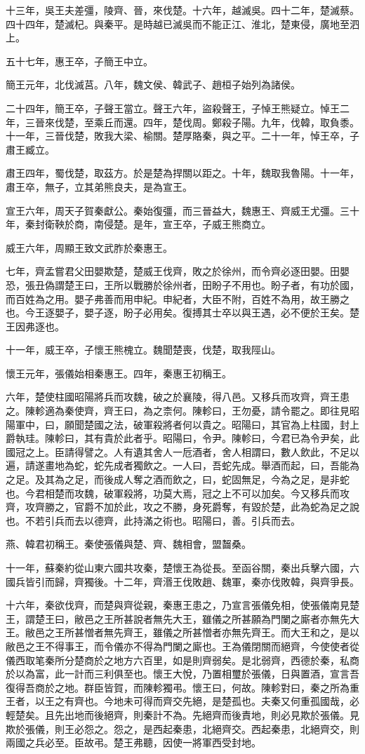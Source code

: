 十三年，吳王夫差彊，陵齊、晉，來伐楚。十六年，越滅吳。四十二年，楚滅蔡。四十四年，楚滅杞。與秦平。是時越已滅吳而不能正江、淮北，楚東侵，廣地至泗上。

五十七年，惠王卒，子簡王中立。

簡王元年，北伐滅莒。八年，魏文侯、韓武子、趙桓子始列為諸侯。

二十四年，簡王卒，子聲王當立。聲王六年，盜殺聲王，子悼王熊疑立。悼王二年，三晉來伐楚，至乘丘而還。四年，楚伐周。鄭殺子陽。九年，伐韓，取負黍。十一年，三晉伐楚，敗我大梁、榆關。楚厚賂秦，與之平。二十一年，悼王卒，子肅王臧立。

肅王四年，蜀伐楚，取茲方。於是楚為捍關以距之。十年，魏取我魯陽。十一年，肅王卒，無子，立其弟熊良夫，是為宣王。

宣王六年，周天子賀秦獻公。秦始復彊，而三晉益大，魏惠王、齊威王尤彊。三十年，秦封衛鞅於商，南侵楚。是年，宣王卒，子威王熊商立。

威王六年，周顯王致文武胙於秦惠王。

七年，齊孟嘗君父田嬰欺楚，楚威王伐齊，敗之於徐州，而令齊必逐田嬰。田嬰恐，張丑偽謂楚王曰，王所以戰勝於徐州者，田盼子不用也。盼子者，有功於國，而百姓為之用。嬰子弗善而用申紀。申紀者，大臣不附，百姓不為用，故王勝之也。今王逐嬰子，嬰子逐，盼子必用矣。復搏其士卒以與王遇，必不便於王矣。楚王因弗逐也。

十一年，威王卒，子懷王熊槐立。魏聞楚喪，伐楚，取我陘山。

懷王元年，張儀始相秦惠王。四年，秦惠王初稱王。

六年，楚使柱國昭陽將兵而攻魏，破之於襄陵，得八邑。又移兵而攻齊，齊王患之。陳軫適為秦使齊，齊王曰，為之柰何。陳軫曰，王勿憂，請令罷之。即往見昭陽軍中，曰，願聞楚國之法，破軍殺將者何以貴之。昭陽曰，其官為上柱國，封上爵執珪。陳軫曰，其有貴於此者乎。昭陽曰，令尹。陳軫曰，今君已為令尹矣，此國冠之上。臣請得譬之。人有遺其舍人一卮酒者，舍人相謂曰，數人飲此，不足以遍，請遂畫地為蛇，蛇先成者獨飲之。一人曰，吾蛇先成。舉酒而起，曰，吾能為之足。及其為之足，而後成人奪之酒而飲之，曰，蛇固無足，今為之足，是非蛇也。今君相楚而攻魏，破軍殺將，功莫大焉，冠之上不可以加矣。今又移兵而攻齊，攻齊勝之，官爵不加於此，攻之不勝，身死爵奪，有毀於楚，此為蛇為足之說也。不若引兵而去以德齊，此持滿之術也。昭陽曰，善。引兵而去。

燕、韓君初稱王。秦使張儀與楚、齊、魏相會，盟齧桑。

十一年，蘇秦約從山東六國共攻秦，楚懷王為從長。至函谷關，秦出兵擊六國，六國兵皆引而歸，齊獨後。十二年，齊湣王伐敗趙、魏軍，秦亦伐敗韓，與齊爭長。

十六年，秦欲伐齊，而楚與齊從親，秦惠王患之，乃宣言張儀免相，使張儀南見楚王，謂楚王曰，敝邑之王所甚說者無先大王，雖儀之所甚願為門闌之廝者亦無先大王。敝邑之王所甚憎者無先齊王，雖儀之所甚憎者亦無先齊王。而大王和之，是以敝邑之王不得事王，而令儀亦不得為門闌之廝也。王為儀閉關而絕齊，今使使者從儀西取笔秦所分楚商於之地方六百里，如是則齊弱矣。是北弱齊，西德於秦，私商於以為富，此一計而三利俱至也。懷王大悅，乃置相璽於張儀，日與置酒，宣言吾復得吾商於之地。群臣皆賀，而陳軫獨弔。懷王曰，何故。陳軫對曰，秦之所為重王者，以王之有齊也。今地未可得而齊交先絕，是楚孤也。夫秦又何重孤國哉，必輕楚矣。且先出地而後絕齊，則秦計不為。先絕齊而後責地，則必見欺於張儀。見欺於張儀，則王必怨之。怨之，是西起秦患，北絕齊交。西起秦患，北絕齊交，則兩國之兵必至。臣故弔。楚王弗聽，因使一將軍西受封地。

